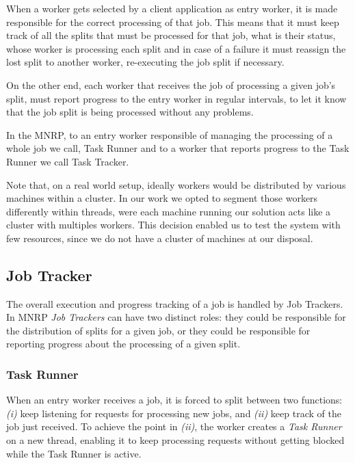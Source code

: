 \documentclass[times, 10pt,twocolumn]{article}
\begin{document}
        When a worker gets selected by a client application as entry worker, it is made responsible for the correct processing of that job. This means that it must keep track of all the splits that must be processed for that job, what is their status, whose worker is processing each split and in case of a failure it must reassign the lost split to another worker, re-executing the job split if necessary.

        On the other end, each worker that receives the job of processing a given job's split, must report progress to the entry worker in regular intervals, to let it know that the job split is being processed without any problems.

        In the \ac{MNRP}, to an entry worker responsible of managing the processing of a whole job we call, Task Runner and to a worker that reports progress to the Task Runner we call Task Tracker.
        
        Note that, on a real world setup, ideally workers would be distributed by various machines within a cluster. In our work we opted to segment those workers differently within threads, were each machine running our solution acts like a cluster with multiples workers. This decision enabled us to test the system with few resources, since we do not have a cluster of machines at our disposal.

    	\subsection{Job Tracker}

        The overall execution and progress tracking of a job is handled by Job Trackers. In \ac{MNRP} \emph{Job Trackers} can have two distinct roles: they could be responsible for the distribution of splits for a given job, or they could be responsible for reporting progress about the processing of a given split.

            \subsubsection{Task Runner}

            When an entry worker receives a job, it is forced to split between two functions: {\it (i)} keep listening for requests for processing new jobs, and {\it (ii)} keep track of the job just received. To achieve the point in {\it (ii)}, the worker creates a \emph{Task Runner} on a new thread, enabling it to keep processing requests without getting blocked while the Task Runner is active.
\end{document}
